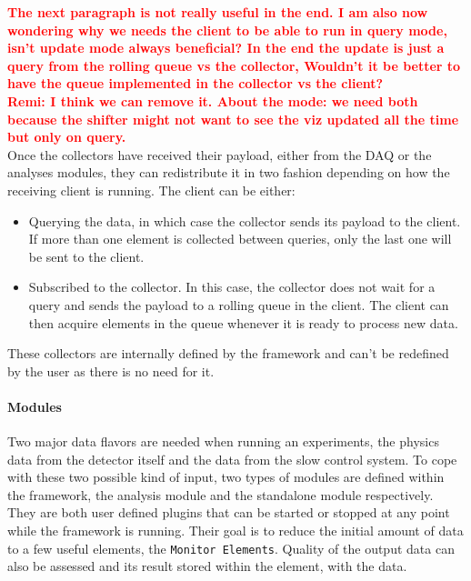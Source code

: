 \documentclass{webofc}
\begin{document}
\textcolor{red}{\textbf{The next paragraph is not really useful in the end. I am also now wondering why we needs the client to be able to run in query mode, isn't update mode always beneficial? In the end the update is just a query from the rolling queue vs the collector, Wouldn't it be better to have the queue implemented in the collector vs the client?}} \\
\textcolor{red}{\textbf{Remi: I think we can remove it. About the mode: we need both because the shifter might not want to see the viz updated all the time but only on query.}}\\
Once the collectors have received their payload, either from the DAQ or the analyses modules, they can redistribute it in two fashion depending on how the receiving client is running. The client can be either:

\begin{itemize}
  \item Querying the data, in which case the collector sends its payload to the client. If more than one element is collected between queries, only the last one will be sent to the client.
  \item Subscribed to the collector. In this case, the collector does not wait for a query and sends the payload to a rolling queue in the client. The client can then acquire elements in the queue whenever it is ready to process new data.  
\end{itemize}

These collectors are internally defined by the framework and can't be redefined by the user as there is no need for it. 

\paragraph{Modules}\label{par:Modules}
Two major data flavors are needed when running an experiments, the physics data from the detector itself and the data from the 
slow control system. To cope with these two possible kind of input, two types of modules are defined within the framework, the 
analysis module and the standalone module respectively. They are both user defined plugins that can be started or stopped at any 
point while the framework is running. Their goal is to reduce the initial amount of data to a few useful elements, the 
\texttt{Monitor Elements}. Quality of the output data can also be assessed and its result stored within the element, with the data.
\end{document}

